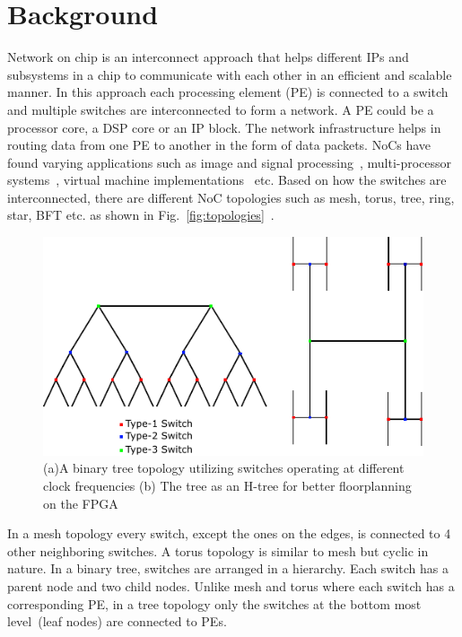 \section{Background}
\label{sec:background}
Network on chip is an interconnect approach that helps different IPs and subsystems in a chip to communicate with each other in an efficient and scalable manner. 
In this approach each processing element (PE) is connected to a switch and multiple switches are interconnected to form a network.
A PE could be a processor core, a DSP core or an IP block.
The network infrastructure helps in routing data from one PE to another in the form of data packets. 
NoCs have found varying applications such as image and signal processing~\cite{Joshi2007}, multi-processor systems~\cite{Bertozzi2005}, virtual machine implementations~\cite{Mathias2006} etc.
Based on how the switches are interconnected, there are different NoC topologies such as mesh, torus, tree, ring, star, BFT etc. as shown in Fig.~\ref{fig:topologies}~\cite{ORTINOBON201624}.

\begin{figure}[t]
\centering
   \includegraphics[width=\columnwidth]{Figures/HNoC.pdf}
   \caption{(a)A binary tree topology utilizing switches operating at different clock frequencies (b) The tree as an H-tree for better floorplanning on the FPGA}
   \label{fig:btree}
\end{figure}

In a mesh topology every switch, except the ones on the edges, is connected to 4 other neighboring switches.
A torus topology is similar to mesh but cyclic in nature.
In a binary tree, switches are arranged in a hierarchy.
Each switch has a parent node and two child nodes.
Unlike mesh and torus where each switch has a corresponding PE, in a tree topology only the switches at the bottom most level~(leaf nodes) are connected to PEs.

